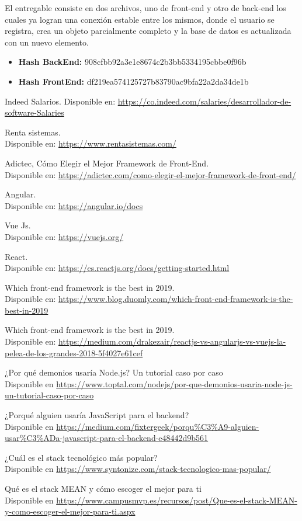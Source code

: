 \documentclass[a4paper,12 pt]{article}
\begin{document}
El entregable consiste en dos archivos, uno de front-end y otro de back-end los
cuales ya logran una conexión estable entre los mismos, donde el usuario se
registra, crea un objeto parcialmente completo y la base de datos es actualizada
con un nuevo elemento.

\begin{itemize}
    \item \textbf{Hash BackEnd:} 908cfbb92a3e1e8674c2b3bb5334195cbbe0f96b
    \item \textbf{Hash FrontEnd:} df219ea574125727b83790ac9bfa22a2da34de1b
\end{itemize}

\begin{thebibliography}{50}

 Indeed Salarios. 
Disponible en: 
\url{https://co.indeed.com/salaries/desarrollador-de-software-Salaries}

 Renta sistemas.\\
Disponible en:
\url{https://www.rentasistemas.com/}

Adictec, Cómo Elegir el Mejor Framework de Front-End.\\
Disponible en:
\url{https://adictec.com/como-elegir-el-mejor-framework-de-front-end/}

Angular.\\
Disponible en:
\url{https://angular.io/docs}

Vue Js.\\
Disponible en:
\url{https://vuejs.org/}

React.\\
Disponible en:
\url{https://es.reactjs.org/docs/getting-started.html}

Which front-end framework is the best in 2019.\\
Disponible en:
\url{https://www.blog.duomly.com/which-front-end-framework-is-the-best-in-2019}

Which front-end framework is the best in 2019.\\
Disponible en:
\url{https://medium.com/drakezair/reactjs-vs-angularjs-vs-vuejs-la-pelea-de-los-grandes-2018-5f4027e61cef}

 ¿Por qué demonios usaría Node.js? Un tutorial caso por caso\\
Disponible en 
\url{https://www.toptal.com/nodejs/por-que-demonios-usaria-node-js-un-tutorial-caso-por-caso}

 ¿Porqué alguien usaría JavaScript para el backend?\\
Disponible en 
\url{https://medium.com/fixtergeek/porqu\%C3\%A9-alguien-usar\%C3\%ADa-javascript-para-el-backend-e48442d9b561}

 ¿Cuál es el stack tecnológico más popular?\\
Disponible en 
\url{https://www.syntonize.com/stack-tecnologico-mas-popular/}

 Qué es el stack MEAN y cómo escoger el mejor para ti\\
Disponible en 
\url{https://www.campusmvp.es/recursos/post/Que-es-el-stack-MEAN-y-como-escoger-el-mejor-para-ti.aspx}

\end{thebibliography}{}
\end{document}
